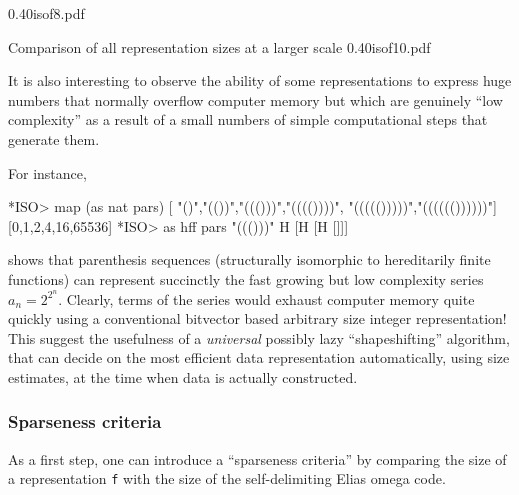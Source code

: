 \documentclass[]{INCLUDES/llncs}
\begin{document}
{0.40}{isof8.pdf}


{Comparison of all representation sizes at a larger scale}
{0.40}{isof10.pdf}

It is also interesting to observe the ability of some representations to
express huge numbers that normally overflow computer memory 
but which are genuinely ``low complexity'' as a result
of a small numbers of simple computational steps 
that generate them. 

For instance,
\begin{codex}
 *ISO> map (as nat pars) 
     [ "()","(())","((()))","(((())))", "((((()))))","(((((())))))"]
 [0,1,2,4,16,65536]
*ISO> as hff pars "((()))"
H [H [H []]]
\end{codex}
shows that parenthesis sequences (structurally isomorphic to hereditarily finite
functions) can represent succinctly the fast growing but low complexity series
$a_n=2^{2^n}$. Clearly, terms of the series would exhaust computer memory quite
quickly using a conventional bitvector based arbitrary size integer
representation! This suggest the usefulness of a {\em universal}
possibly lazy ``shapeshifting'' algorithm, that can decide on 
the most efficient data representation
automatically, using size estimates, at the time when
data is actually constructed.

\subsubsection{Sparseness criteria}

As a first step, one can introduce a ``sparseness criteria'' by comparing
the size of a representation {\tt f} with the size of the self-delimiting
Elias omega code.
\end{document}
